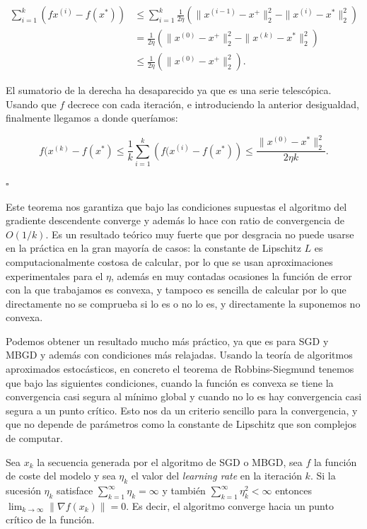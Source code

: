 \begin{align*}
    \sum^k_{i=1} \left ( fx^{(i)} - f(x^*) \right ) &\leq \sum^k_{i=1} \frac{1}{2\eta}  \left ( \| x^{(i-1)} - x^+ \|^2_2 -  \| x^{(i)} - x^* \|^2_2 \right ) \\ 
    &=\frac{1}{2\eta}  \left ( \| x^{(0)} - x^+ \|^2_2 -  \| x^{(k)} - x^* \|^2_2 \right ) \\ 
    &\leq \frac{1}{2\eta}  \left ( \| x^{(0)} - x^+ \|^2_2 \right ). 
\end{align*}

El sumatorio de la derecha ha desaparecido ya que es una serie telescópica. Usando que $f$ decrece con cada iteración, e introduciendo la anterior desigualdad, finalmente llegamos a donde queríamos:

$$f(x^{(k)} - f(x^*) \leq \frac{1}{k} \sum ^k _{i=1} \left ( f(x^{(i)} - f(x^*) \right ) \leq \frac{\|x^{(0)}-x^* \|^2_2}{2\eta k} .$$


\begin{flushright}
    $\square$
\end{flushright} 


Este teorema nos garantiza que bajo las condiciones supuestas el algoritmo del gradiente descendente converge y además lo hace con ratio de convergencia de $O(1/k)$. Es un resultado teórico muy fuerte que por desgracia no puede usarse en la práctica en la gran mayoría de casos: la constante de Lipschitz $L$ es computacionalmente costosa de calcular, por lo que se usan aproximaciones experimentales para el $\eta$, además en muy contadas ocasiones la función de error con la que trabajamos es convexa, y tampoco es sencilla de calcular por lo que directamente no se comprueba si lo es o no lo es, y directamente la suponemos no convexa. 

Podemos obtener un resultado mucho más práctico, ya que es para SGD y MBGD y además con condiciones más relajadas. Usando la teoría de algoritmos aproximados estocásticos, en concreto el teorema de Robbins-Siegmund tenemos que bajo las siguientes condiciones, cuando la función es convexa se tiene la convergencia casi segura al mínimo global y cuando no lo es hay convergencia casi segura a un punto crítico. Esto nos da un criterio sencillo para la convergencia, y que no depende de parámetros como la constante de Lipschitz que son complejos de computar.


\begin{proposicion}\label{prop:convsgd}
    Sea ${x_k}$ la secuencia generada por el algoritmo de SGD o MBGD, sea $f$ la función de coste del modelo y sea $\eta_k$ el valor del \textit{learning rate} en la iteración $k$. Si la sucesión ${\eta_k}$ satisface $\sum_{k=1}^\infty \eta_k = \infty$ y también $\sum_{k=1}^\infty \eta_k ^2 < \infty$  entonces $\lim_{k\rightarrow\infty} \| \nabla f(x_k) \| =0$. Es decir, el algoritmo converge hacia un punto crítico de la función.%
\end{proposicion}


